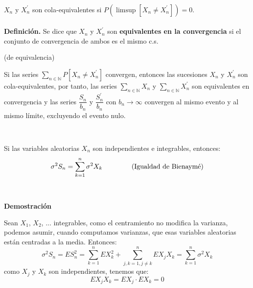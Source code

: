 \

$X_n$ y $X_n^{'}$ son cola-equivalentes si 
$P \left( \limsup [X_n \not = X_n^{'}] \right) = 0$.
\\\\
\textbf{Definición. } %
Se dice que $X_n$ y $X_n^{\prime}$ son  \textbf{equivalentes en la convergencia} si el conjunto de convergencia de ambos es el mismo c.s.



\begin{lemma} (de equivalencia)
  
Si las series $\sum_{n\in\mathbb{N}} P[X_n\neq X_n^{\prime}]$ convergen, entonces las sucesiones $X_n$ y $X_n^{\prime}$ son cola-equivalentes, por tanto, las series $\sum_{n\in\mathbb{N}} X_n$ y $\sum_{n\in\mathbb{N}} X_n^{\prime}$ son equivalentes en  convergencia y las series $\dfrac{S_n}{b_n}$ y $\dfrac{S_n^{\prime}}{b_n}$ con $b_n \rightarrow\infty$ convergen al mismo evento y al mismo límite, excluyendo el evento nulo.
\end{lemma}



\

Si las variables aleatorias $X_n$ son independientes e integrables, entonces:
$$ \sigma^2 S_n=\sum_{k=1}^n \sigma^2 X_k \hspace{1.5cm} \text{(Igualdad de Bienaymé)}$$

\

\textbf{Demostración}

Sean $X_1$, $X_2$, ... integrables, como el centramiento no modifica la varianza, podemos asumir, cuando computamos varianzas, que esas variables aleatorias están centradas a la media. Entonces:
$$\sigma^2 S_n=ES_n^2=\sum_{k=1}^n EX_k^2+\sum_{j,k=1, j\not = k}^n EX_jX_k=\sum_{k=1}^n\sigma^2 X_k$$
como $X_j$ y $X_k$ son independientes, tenemos que:
$$EX_jX_k=EX_j\cdot EX_k=0$$




\

